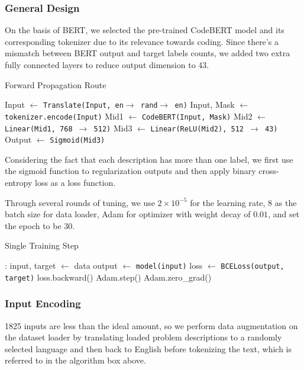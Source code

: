 \documentclass{article}
\begin{document}
\subsubsection{General Design}
On the basis of BERT, we selected the pre-trained CodeBERT\cite{CodeBERT} model and its corresponding tokenizer due to its relevance towards coding. Since there's a mismatch between BERT output and target labels counts, we added two extra fully connected layers to reduce output dimension to 43.
\begin{algorithm}
\caption{Forward Propagation Route}\label{alg:cap}
\begin{algorithmic}[1]
\State Input $\gets$ \texttt{Translate(Input, en$\to$ rand$\to$ en)} 
\State Input, Mask $\gets$ \texttt{tokenizer.encode(Input)} 
\State Mid1 $\gets$ \texttt{CodeBERT(Input, Mask)} 
\State Mid2 $\gets$ \texttt{Linear(Mid1, 768 $\to$ 512)} 
\State Mid3 $\gets$ \texttt{Linear(ReLU(Mid2), 512 $\to$ 43)} 
\State Output $\gets$ \texttt{Sigmoid(Mid3)} 
\end{algorithmic}
\end{algorithm}

Considering the fact that each description has more than one label, we first use the sigmoid function to regularization outputs and then apply binary cross-entropy loss as a loss function.

Through several rounds of tuning, we use $2\times 10^{-5}$ for the learning rate, $8$ as the batch size for data loader, Adam for optimizer with weight decay of $0.01$, and set the epoch to be $30$.
\begin{algorithm}
\caption{Single Training Step}\label{alg:cap}
\begin{algorithmic}[1]
:
\State input, target $\gets$ data
\State output $\gets$ \texttt{model(input)}
\State loss $\gets$ \texttt{BCELoss(output, target)} 
\State loss.backward() 
\State Adam.step() 
\State Adam.zero\_grad()
\EndFor
\end{algorithmic}
\end{algorithm}
\subsubsection{Input Encoding}
1825 inputs are less than the ideal amount, so we perform data augmentation on the dataset loader by translating loaded problem descriptions to a randomly selected language and then back to English before tokenizing the text, which is referred to in the algorithm box above.
\end{document}
